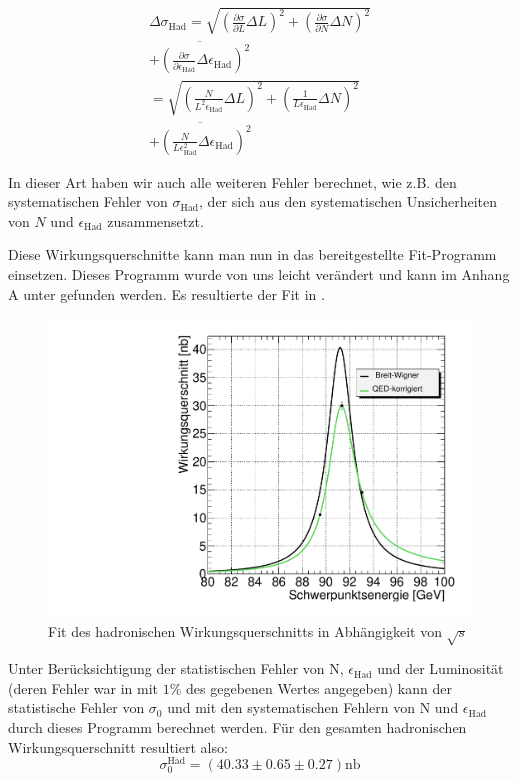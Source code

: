 \begin{equation}
  \begin{split}
    \Delta\sigma_\mathrm{Had} =  \sqrt{\left( \frac{\partial\sigma}{\partial L}\Delta L\right)^2 + \left( \frac{\partial\sigma}{\partial N}\Delta N\right)^2} \\
    \overline{+ \left( \frac{\partial\sigma}{\partial \epsilon_\mathrm{Had}}\Delta\epsilon_\mathrm{Had} \right)^2} \\
    = \sqrt{\left( \frac{N}{L^2\epsilon_\mathrm{Had}}\Delta L\right)^2 + \left( \frac{1}{L\epsilon_\mathrm{Had}}\Delta N\right)^2} \\
    \overline{+ \left( \frac{N}{L \epsilon_\mathrm{Had}^2}\Delta\epsilon_\mathrm{Had} \right)^2}
  \end{split}
\end{equation}

In dieser Art haben wir auch alle weiteren Fehler berechnet, wie z.B. den systematischen Fehler von $\sigma_\mathrm{Had}$, der sich aus den systematischen Unsicherheiten von $N$ und $\epsilon_{\mathrm{Had}}$ zusammensetzt.

Diese Wirkungsquerschnitte kann man nun in das bereitgestellte Fit-Programm einsetzen. Dieses Programm wurde von uns leicht verändert und kann im Anhang A unter  gefunden werden. Es resultierte der Fit in .\\
\begin{figure}[htb]
	\centering
	\includegraphics[width=1\columnwidth,keepaspectratio]{fit_had}
	\caption{Fit des hadronischen Wirkungsquerschnitts in Abhängigkeit von $\sqrt{s}$}
	\label{fig:hadfit}
\end{figure}
Unter Berücksichtigung der statistischen Fehler von N, $\epsilon_\mathrm{Had}$ und der Luminosität (deren Fehler war in \cite[S.9]{script} mit $1\%$ des gegebenen Wertes angegeben) kann der statistische Fehler von $\sigma_0$ und mit den systematischen Fehlern von N und $\epsilon_{\mathrm{Had}}$ durch dieses Programm berechnet werden. Für den gesamten hadronischen Wirkungsquerschnitt resultiert also:
\begin{equation*}
\sigma_0^{\mathrm{Had}} = (40.33 \pm 0.65 \pm 0.27) \si{\nano\barn}
\end{equation*}

